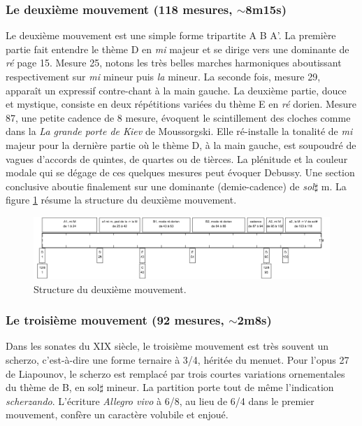 \subsubsection*{Le deuxième mouvement (118 mesures, $\sim$8m15s)}

Le deuxième mouvement est une simple forme tripartite A B A'. La première partie fait entendre le thème D en \emph{mi} majeur et se dirige vers une dominante de \emph{ré} page 15. Mesure 25, notons les très belles marches harmoniques aboutissant respectivement sur \emph{mi} mineur puis \emph{la} mineur. La seconde fois, mesure 29, apparaît un expressif contre-chant à la main gauche. La deuxième partie, douce et mystique, consiste en deux répétitions variées du thème E en \emph{ré} dorien. Mesure 87, une petite cadence de 8 mesure, évoquent le scintillement des cloches comme dans la \emph{La grande porte de Kiev} de Moussorgski. Elle ré-installe la tonalité de \emph{mi} majeur pour la dernière partie où le thème D, à la main gauche, est soupoudré de vagues d'accords de quintes, de quartes ou de tièrces. La plénitude et la couleur modale qui se dégage de ces quelques mesures peut évoquer Debussy. Une section conclusive aboutie finalement sur une dominante (demie-cadence) de \emph{sol}$\sharp$ m. La figure \ref{schema-2} résume la structure du deuxième mouvement.

\begin{figure}[!ht]
  \begin{bigcenter}
    \includegraphics[width=17.5cm, keepaspectratio]{frise-mvt2.png}
  \end{bigcenter}
  \caption{\label{schema-2}Structure du deuxième mouvement.}
\end{figure}

\subsubsection*{Le troisième mouvement (92 mesures, $\sim$2m8s)}

Dans les sonates du XIX\ieme{} siècle, le troisième mouvement est très souvent un scherzo, c'est-à-dire une forme ternaire à 3/4, héritée du menuet. Pour l'opus 27 de Liapounov, le scherzo est remplacé par trois courtes variations ornementales du thème de B, en sol$\sharp$ mineur. La partition porte tout de même l'indication \emph{scherzando}. L'écriture \emph{Allegro vivo} à 6/8, au lieu de 6/4 dans le premier mouvement, confère un caractère volubile et enjoué.


